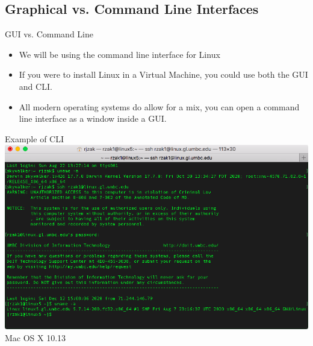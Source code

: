 \documentclass[graphics]{beamer}
\begin{document}
\subsection{Graphical vs. Command Line Interfaces}
\begin{frame}{GUI vs. Command Line}
    \begin{itemize}
        \item We will be using the command line interface for Linux
        \item If you were to install Linux in a Virtual Machine, you could use both the GUI and CLI.
        \item All modern operating systems do allow for a mix, you can open a command line interface as a window inside a GUI.
    \end{itemize}
\end{frame}

\begin{frame}{Example of CLI}
    \includegraphics[scale=0.43]{L03_OperatingSystems/L3_SSH.png}
    \footnotesize{Mac OS X 10.13}
\end{frame}
\end{document}
